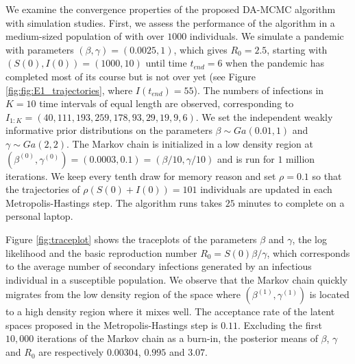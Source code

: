 \documentclass[11pt]{article}
\begin{document}
	
	
	
	We examine the convergence properties of the proposed DA-MCMC algorithm with simulation studies. First, we assess the performance of the algorithm in a medium-sized population of with over $1000$ individuals. We simulate a pandemic with parameters $(\beta, \gamma) = (0.0025, 1)$, which gives $R_0 = 2.5$, starting with $(S(0), I(0)) = (1000, 10)$ until time $t_{end} = 6$ when the pandemic has completed most of its course but is not over yet (see Figure \ref{fig:fig:E1_trajectories}, where $I(t_{end}) = 55$). The numbers of infections in $K = 10$ time intervals of equal length are observed, corresponding to $I_{1:K} = (40, 111, 193, 259, 178, 93, 29, 19, 9, 6)$.	
	We set the independent weakly informative prior distributions on the parameters $\beta \sim Ga(0.01, 1)$ and $\gamma \sim Ga(2,2)$.
	The Markov chain is initialized in a low density region at $(\beta^{(0)}, \gamma^{(0)}) = (0.0003, 0.1) = (\beta/10, \gamma/10)$ and is run for $1$ million iterations. We keep every tenth draw for memory reason and set $\rho = 0.1$ so that the trajectories of $\rho (S(0)+I(0)) = 101$ individuals are updated in each Metropolis-Hastings step. The algorithm runs takes $25$ minutes to complete on a personal laptop.
	
	Figure \ref{fig:traceplot} shows the traceplots of the parameters $\beta$ and $\gamma$, the log likelihood and the basic reproduction number $R_0 = S(0) \beta / \gamma$, which corresponds to the average number of secondary infections generated by an infectious individual in a susceptible population. We observe that the Markov chain quickly migrates from the low density region of the space where $(\beta^{(1)}, \gamma^{(1)})$ is located to a high density region where it mixes well. The acceptance rate of the latent spaces proposed in the Metropolis-Hastings step is $0.11$.
	Excluding the first $10,000$ iterations of the Markov chain as a burn-in, the posterior means of $\beta$, $\gamma$ and $R_0$ are respectively $0.00304$, $0.995$ and $3.07$.
	
\end{document}
